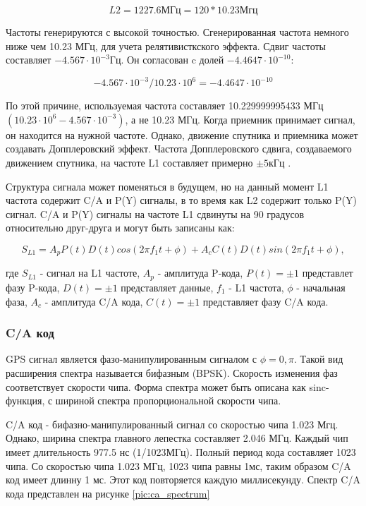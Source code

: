 \begin{equation}
L2=1227.6\mbox{МГц}=120*10.23\mbox{Мгц}
\label{eq:l2_freq}
\end{equation}

Частоты генерируются с высокой точностью. Сгенерированная частота немного ниже чем 10.23 МГц, для учета 
релятивисткского эффекта. Сдвиг частоты составляет ${-4.567\cdot10^{-3}\mbox{Гц}}$. Он согласован c долей
${-4.4647\cdot10^{-10}}$:

\begin{equation}
-4.567\cdot10^{-3}/10.23\cdot10^{6} = -4.4647\cdot10^{-10}
\end{equation}

По этой причине, используемая частота составляет 10.229999995433 МГц ${(10.23\cdot10^{6} - 4.567\cdot10^{-3})}$,
а не 10.23 МГц. Когда приемник принимает сигнал, он находится
на нужной частоте. Однако, движение спутника и приемника может создавать Допплеровский эффект. Частота Допплеровского
сдвига, создаваемого движением спутника, на частоте L1 составляет примерно ${\pm5\mbox{кГц}}$ \cite{yacenkov, tsui}.

Структура сигнала может поменяться в будущем, но на данный момент L1 частота содержит C/A и P(Y) сигналы, в то
время как L2 содержит только P(Y) сигнал. C/A и P(Y) сигналы на частоте L1 сдвинуты на 90 градусов
относительно друг-друга и могут быть записаны как:

\begin{equation}
S_{L1}=A_p P(t) D(t) cos(2\pi f_1 t + \phi) + A_c C(t) D(t) sin(2\pi f_1 t + \phi),
\label{eq:s_l1}
\end{equation}

где ${S_{L1}}$ - сигнал на L1 частоте, ${A_p}$ - амплитуда P-кода, ${P(t)=\pm 1}$ представлет фазу P-кода,
${D(t) = \pm 1}$ представляет данные, ${f_1}$ - L1 частота, ${\phi}$ - начальная фаза, ${A_c}$ - амплитуда C/A кода,
${C(t)} = \pm 1$ представляет фазу C/A кода.

\subsubsection*{C/A код}
GPS сигнал является фазо-манипулированным сигналом с ${\phi = 0, \pi}$. Такой вид расширения спектра называется бифазным 
(BPSK). Скорость изменения фаз соответствует скорости чипа. Форма спектра может быть описана как sinc-функция,
с шириной спектра пропорциональной скорости чипа. 

C/A код - бифазно-манипулированный сигнал со скоростью чипа 1.023 Мгц. Однако, ширина спектра главного лепестка составляет
2.046 МГц. Каждый чип имеет длительность 977.5 нс (1/1023МГц). Полный период кода составляет 1023 чипа. Со скоростью
чипа 1.023 МГц, 1023 чипа равны 1мс, таким образом C/A код имеет длинну 1 мс. Этот код повторяется каждую миллисекунду.
Спектр C/A кода представлен на рисунке \ref{pic:ca_spectrum}

